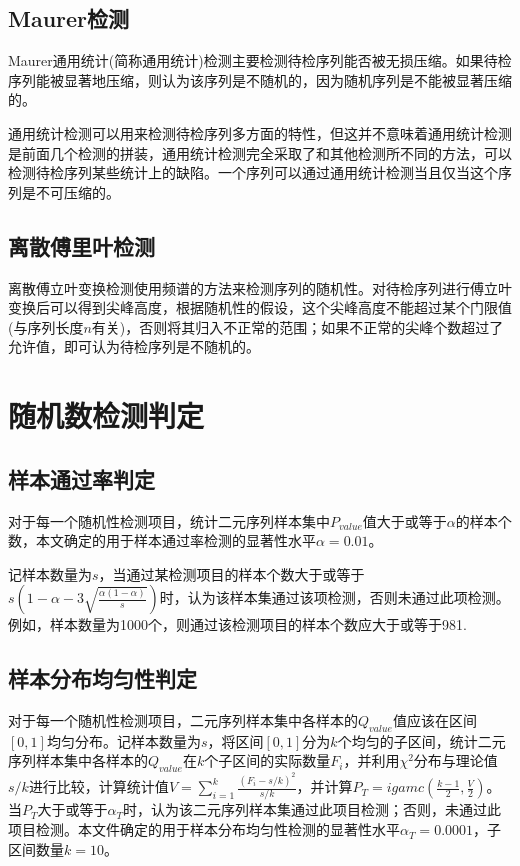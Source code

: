 \documentclass[12pt,a4paper]{article}%
\begin{document}
    \subsection{Maurer检测}
    Maurer通用统计(简称通用统计)检测主要检测待检序列能否被无损压缩。如果待检序列能被显著地压缩，则认为该序列是不随机的，因为随机序列是不能被显著压缩的。

    通用统计检测可以用来检测待检序列多方面的特性，但这并不意味着通用统计检测是前面几个检测的拼装，通用统计检测完全采取了和其他检测所不同的方法，可以检测待检序列某些统计上的缺陷。一个序列可以通过通用统计检测当且仅当这个序列是不可压缩的。

    \subsection{离散傅里叶检测}
    离散傅立叶变换检测使用频谱的方法来检测序列的随机性。对待检序列进行傅立叶变换后可以得到尖峰高度，根据随机性的假设，这个尖峰高度不能超过某个门限值(与序列长度$n$有关)，否则将其归入不正常的范围；如果不正常的尖峰个数超过了允许值，即可认为待检序列是不随机的。


    \section{随机数检测判定}

    \subsection{样本通过率判定}
    对于每一个随机性检测项目，统计二元序列样本集中$P_{value}$值大于或等于$\alpha$的样本个数，本文确定的用于样本通过率检测的显著性水平$\alpha=0.01$。

    记样本数量为$s$，当通过某检测项目的样本个数大于或等于$s(1-\alpha-3\sqrt{\frac{\alpha(1-\alpha)}{s}})$时，认为该样本集通过该项检测，否则未通过此项检测。例如，样本数量为1000个，则通过该检测项目的样本个数应大于或等于981.

    \subsection{样本分布均匀性判定}
    对于每一个随机性检测项目，二元序列样本集中各样本的$Q_{value}$值应该在区间$[0,1]$均匀分布。记样本数量为$s$，将区间$[0,1]$分为$k$个均匀的子区间，统计二元序列样本集中各样本的$Q_{value}$在$k$个子区间的实际数量$F_i$，并利用$\chi^2$分布与理论值$s/k$进行比较，计算统计值$V=\sum_{i=1}^{k}\frac{(F_i-s/k)^2}{s/k} $，并计算$P_T=igamc(\frac{k-1}{2},\frac{V}{2})$。当$P_T$大于或等于$\alpha_T$时，认为该二元序列样本集通过此项目检测；否则，未通过此项目检测。本文件确定的用于样本分布均匀性检测的显著性水平$\alpha_T=0.0001$，子区间数量$k=10$。
\end{document}
